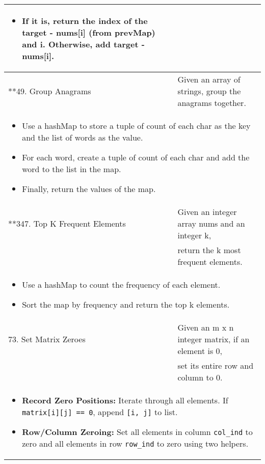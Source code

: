 \begin{summary}
\begin{center}
\begin{tabular}{ll}
{\begin{itemize}
\begin{itemize}
                        \item If it is, return the index of the target - nums[i] (from prevMap) and i. Otherwise, add target - nums[i].
                    \end{itemize}
                \end{itemize}
            } \\
            \midrule
            **49. Group Anagrams & Given an array of strings, group the anagrams together. \\
            \multicolumn{2}{p{\linewidth}}{
                \begin{itemize}
                    \item Use a hashMap to store a tuple of count of each char as the key and the list of words as the value.
                    \item For each word, create a tuple of count of each char and add the word to the list in the map.
                    \item Finally, return the values of the map.
                \end{itemize}
            } \\
            \midrule
            **347. Top K Frequent Elements & Given an integer array nums and an integer k, \\
            & return the k most frequent elements. \\
            \multicolumn{2}{p{\linewidth}}{
                \begin{itemize}
                    \item Use a hashMap to count the frequency of each element.
                    \item Sort the map by frequency and return the top k elements.
                \end{itemize}
            } \\
            \midrule
            73. Set Matrix Zeroes & Given an m x n integer matrix, if an element is 0, \\
            & set its entire row and column to 0. \\
            \multicolumn{2}{p{\linewidth}}{
                \begin{itemize}                
                    \item \textbf{Record Zero Positions:} Iterate through all elements. If \texttt{matrix[i][j] == 0}, append \texttt{[i, j]} to list.
                    \item \textbf{Row/Column Zeroing:} Set all elements in column \texttt{col\_ind} to zero and all elements in row \texttt{row\_ind} to zero using two helpers.

\end{itemize}}
\end{tabular}
\end{center}
\end{summary}
